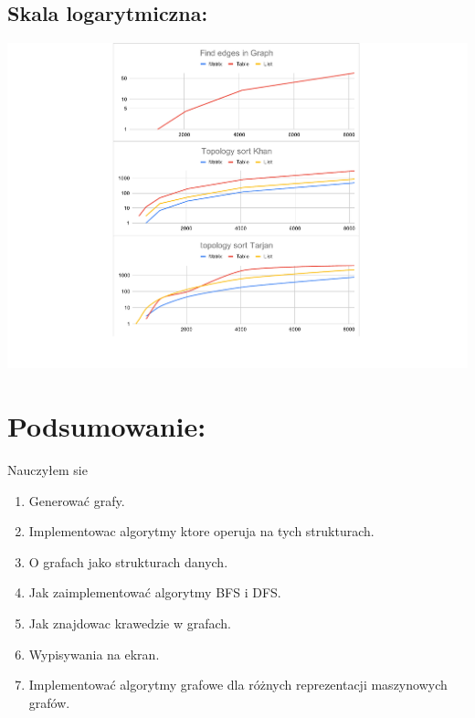 \documentclass[12pt]{article}
\begin{document}
\subsection{Skala logarytmiczna: }

\begin{center}

\includegraphics[width=\linewidth]{wykresy_logarytmiczna.pdf}

\end{center}

\section{Podsumowanie: }

Nauczyłem sie

\begin{enumerate}

	\item
	      Generować grafy.
	\item
		  Implementowac algorytmy ktore operuja na tych strukturach.
	\item
		  O grafach jako strukturach danych.
	\item
		  Jak zaimplementować algorytmy BFS i DFS.
	\item
		  Jak znajdowac krawedzie w grafach.
    \item
    	      Wypisywania na ekran.
  	\item
  		  Implementować algorytmy grafowe dla różnych reprezentacji maszynowych grafów.

\end{enumerate}

\begin{center}

\tableofcontents

\end{center}
\end{document}
